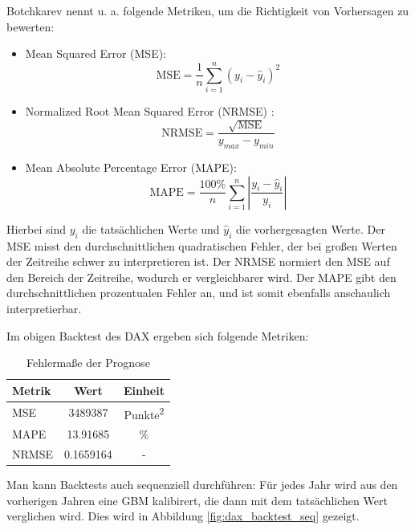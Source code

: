 \begin{bem}
Botchkarev \cite{botchkarev_performance_2019} nennt u. a. folgende Metriken, um die Richtigkeit von Vorhersagen zu bewerten:
\begin{itemize}
    \item Mean Squared Error (MSE): $$\text{MSE} = \frac{1}{n} \sum_{i=1}^n (y_i - \hat{y}_i)^2$$
    \item Normalized Root Mean Squared Error (NRMSE) : $$\text{NRMSE} = \frac{\sqrt{\text{MSE}}}{y_{max} - y_{min}}$$
    \item Mean Absolute Percentage Error (MAPE): $$\text{MAPE} = \frac{100\%}{n} \sum_{i=1}^n \left|\frac{y_i - \hat{y}_i}{y_i}\right|$$
\end{itemize}

Hierbei sind $y_i$ die tatsächlichen Werte und $\hat{y}_i$ die vorhergesagten Werte.
Der MSE misst den durchschnittlichen quadratischen Fehler, der bei großen Werten der Zeitreihe schwer 
zu interpretieren ist. Der NRMSE normiert den MSE auf den Bereich der Zeitreihe,
wodurch er vergleichbarer wird. Der MAPE gibt den durchschnittlichen prozentualen Fehler an, und ist
somit ebenfalls anschaulich interpretierbar.

\end{bem}

\begin{bsp}
Im obigen Backtest des DAX ergeben sich folgende Metriken:

\begin{table}[h]
    \centering
    \begin{tabular}{lcc}
        \toprule
        Metrik & Wert & Einheit \\
        \midrule
        MSE    & 3489387 & Punkte\textsuperscript{2} \\
        MAPE   & 13.91685   & \% \\
        NRMSE  & 0.1659164 & - \\
        \bottomrule
    \end{tabular}
    \caption{Fehlermaße der Prognose}
    \label{tab:metrics}
\end{table}

\end{bsp}

\begin{bsp}
Man kann Backtests auch sequenziell durchführen: Für jedes Jahr wird aus den vorherigen Jahren eine GBM kalibirert, die dann mit dem tatsächlichen Wert verglichen wird. Dies wird in Abbildung \ref{fig:dax_backtest_seq} gezeigt.
\end{bsp}

